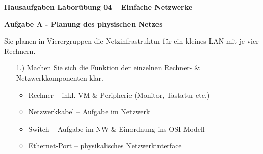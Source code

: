 \documentclass[paper=a4,fontsize=11pt]{scrartcl}%
\numberwithin{equation}{section}
\begin{document}
\begin{center}
\Large{\textbf{Hausaufgaben Laborübung 04 -- Einfache Netzwerke}}
\end{center}
\begin{center}\Large{\textbf{Aufgabe A - Planung des physischen Netzes}}\end{center}\vskip0.25in
Sie planen in Vierergruppen die Netzinfrastruktur für ein kleines LAN mit je vier Rechnern.
\begin{itemize}
	\item[1.)] Machen Sie sich die Funktion der einzelnen Rechner- \& Netzwerkkomponenten klar.
\begin{itemize}
    \item Rechner -- inkl. VM \& Peripherie (Monitor, Tastatur etc.)
    \item Netzwerkkabel -- Aufgabe im Netzwerk
    \item Switch -- Aufgabe im NW \& Einordnung ins OSI-Modell
    \item Ethernet-Port -- physikalisches Netzwerkinterface
\end{itemize}
	

\end{itemize}
\end{document}
